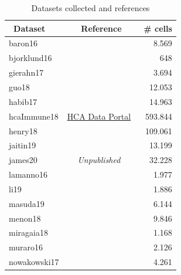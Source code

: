 \begin{table}[ht!] %
\footnotesize
\caption[Datasets collected and references]{Datasets collected and references}
\centering
\label{table:tab_4_1}

\begin{tabular}{l|c|r}
\toprule
~\textbf{Dataset} & ~\textbf{Reference} & ~\textbf{\# cells} \\
\midrule
baron16 & ~\citep{baron_single-cell_2016} & 8.569  \\

bjorklund16 & ~\citep{bjorklund_heterogeneity_2016} & 648  \\

gierahn17 & ~\citep{gierahn_seq-well:_2017} & 3.694  \\

guo18 & ~\citep{guo_adult_2018} & 12.053  \\

habib17 & ~\citep{habib_massively_2017} & 14.963  \\

hcaImmune18 & \href{data.humancellatlas.org}{HCA Data Portal} & 593.844  \\

henry18 & ~\citep{henry_cellular_2018} & 109.061  \\

jaitin19 & ~\citep{jaitin_lipid-associated_2019} & 13.199  \\

james20 & \textit{Unpublished} & 32.228  \\

lamanno16 & ~\citep{la_manno_molecular_2016} & 1.977  \\

li19 & ~\citep{li_memory_2019} & 1.886  \\

masuda19 & ~\citep{masuda_spatial_2019} & 6.144  \\

menon18 & ~\citep{menon_single-cell_2018} & 9.846  \\

miragaia18 & ~\citep{miragaia_single-cell_2019} & 1.168  \\

muraro16 & ~\citep{muraro_single-cell_2016} & 2.126  \\

nowakowski17 & ~\citep{nowakowski_spatiotemporal_2017} & 4.261  \\


\end{tabular}
\end{table}
